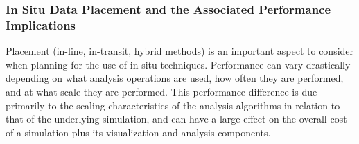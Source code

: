 


\subsubsection{In Situ Data Placement and the Associated Performance Implications}
\label{sec:implications}
Placement (in-line, in-transit, hybrid methods) is an important aspect to consider when planning for the use of in situ techniques. Performance can vary drastically depending on what analysis operations are used, how often they are performed, and at what scale they are performed. This performance difference is due primarily to the scaling characteristics of the analysis algorithms in relation to that of the underlying simulation, and can have a large effect on the overall cost of a simulation plus its visualization and analysis components. 


